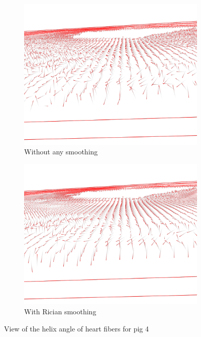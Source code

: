 \begin{figure}
    \centering
    \begin{subfigure}{.48\textwidth}
        \includegraphics[width=\textwidth]{figures/pig4_helix_no_smooth}
        \caption{Without any smoothing}
        \label{fig:pig4_helix_no_smooth}
    \end{subfigure}
    \begin{subfigure}{.48\textwidth}
        \includegraphics[width=\textwidth]{figures/pig4_helix_smooth}
        \caption{With Rician smoothing}
        \label{fig:pig4_helix_smooth}
    \end{subfigure}
    \caption{View of the helix angle of heart fibers for pig 4}
    \label{fig:pig4_helix}
\end{figure}

